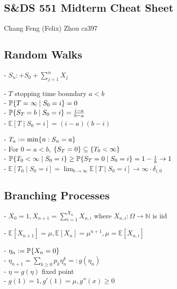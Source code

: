 \documentclass[10pt]{article}
\DeclarePairedDelimiter{\set}{\lbrace}{\rbrace}
\newcommand{\E}{\mathbb{E}}
\newcommand{\N}{\mathbb{N}}
\renewcommand{\P}{\mathbb{P}}
\newcommand{\sset}{\subseteq}
\begin{document}
\iffalse
\begin{center}
    {\Large\textbf{Yale University}}\\
    \vspace{3mm}
    {\Large\textbf{S\&DS 551, Spring 2023}}\\
    \vspace{2mm}
    {\Large\textbf{Homework 3}}\\
    \vspace{3mm}
    \textbf{Chang Feng (Felix) Zhou cz397}
\end{center}
\fi

\begin{multicols}{3}
\section*{S\&DS 551 Midterm Cheat Sheet}
Chang Feng (Felix) Zhou
cz397

\subsection*{Random Walks}
- $S_n :+ S_0 + \sum_{j=1}^n X_j$

- $T$ stopping time boundary $a < b$ \\
- $\P\set{T=\infty\mid S_0=i} = 0$ \\
- $\P\set{S_T = b\mid S_0=i} = \frac{i-a}{b-a}$ \\
- $\E\left[ T\mid S_0=i \right] = (i-a)(b-i)$

- $T_a := \min\set{n: S_n=a}$ \\
- For $0=a<b$,
$\set{S_T=0}\sset \set{T_0<\infty}$ \\
- $\P\set{T_0<\infty\mid S_0=i}\geq \P\set{S_T=0\mid S_0=i} = 1-\frac{i}b\to 1$ \\
- $\E\left[ T_0\mid S_0=i \right] = \lim_{b\to \infty} \E\left[ T\mid S_0=i \right] \to \infty\cdot \delta_{i, 0}$


\subsection*{Branching Processes}
- $X_0 = 1, X_{n+1} = \sum_{i=1}^{X_n} X_{n, i}$
where $X_{n, i}: \Omega\to \N$ is iid

- $\E[X_{n+1}] = \mu, \E[X_n] = \mu^{n+1}, \mu = \E[X_{n, i}]$

- $\eta_n := \P\set{X_n=0}$ \\
- $\eta_{n+1} = \sum_{k\geq 0} p_k \eta_n^k =: g(\eta_n)$ \\
- $\eta = g(\eta)$ fixed point \\
- $g(1) = 1, g'(1) = \mu, g''(x)\geq 0$


\end{multicols}
\end{document}
